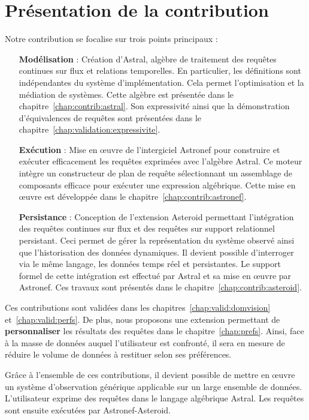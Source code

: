 \chapter*{Présentation de la contribution}
Notre contribution se focalise sur trois points principaux :
\begin{itemize}
 \item[\textbf{Modélisation}] : Création d'Astral, algèbre de traitement des requêtes continues sur flux et relations temporelles. En particulier, les définitions sont indépendantes du système d'implémentation. Cela permet l'optimisation et la médiation de systèmes. Cette algèbre est présentée dans le chapitre~\ref{chap:contrib:astral}. Son expressivité ainsi que la démonstration d'équivalences de requêtes sont présentées dans le chapitre~\ref{chap:validation:expressivite}.
 \item[\textbf{Exécution}] : Mise en œuvre de l'intergiciel Astronef pour construire et exécuter efficacement les requêtes exprimées avec l'algèbre Astral. Ce moteur intègre un constructeur de plan de requête sélectionnant un assemblage de composants efficace pour exécuter une expression algébrique. Cette mise en œuvre est développée dans le chapitre~\ref{chap:contrib:astronef}.
 \item[\textbf{Persistance}] : Conception de l'extension Asteroid permettant l'intégration des requêtes continues sur flux et des requêtes sur support relationnel persistant. Ceci permet de gérer la représentation du système observé ainsi que l'historisation des données dynamiques. Il devient possible d'interroger via le même langage, les données temps réel et persistantes. Le support formel de cette intégration est effectué par Astral et sa mise en œuvre par Astronef. Ces travaux sont présentés dans le chapitre~\ref{chap:contrib:asteroid}.
\end{itemize}

Ces contributions sont validées dans les chapitres~\ref{chap:valid:domvision} et~\ref{chap:valid:perfs}. De plus, nous proposons une extension permettant de \textbf{personnaliser} les résultats des requêtes dans le chapitre~\ref{chap:prefs}. Ainsi, face à la masse de données auquel l'utilisateur est confronté, il sera en mesure de réduire le volume de données à restituer selon ses préférences.

Grâce à l'ensemble de ces contributions, il devient possible de mettre en œuvre un système d'observation générique applicable sur un large ensemble de données. L'utilisateur exprime des requêtes dans le langage algébrique Astral. Les requêtes sont ensuite exécutées par Astronef-Asteroid. 

